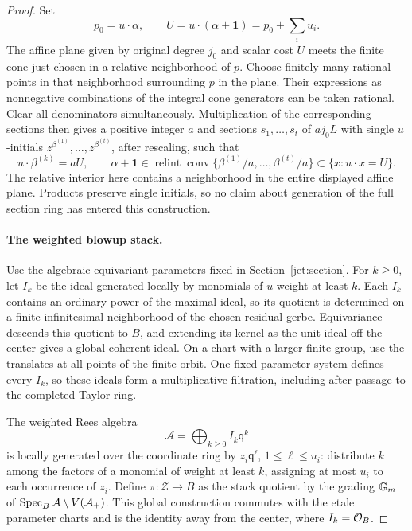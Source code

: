 \begin{proof}
Set
\[
 p_0=u\cdot\alpha,
 \qquad U=u\cdot(\alpha+\mathbf1)=p_0+\sum_i u_i.
\]
The affine plane given by original degree $j_0$ and scalar cost $U$
meets the finite cone just chosen in a relative neighborhood of $p$.
Choose finitely many rational points in that neighborhood surrounding
$p$ in the plane.  Their expressions as nonnegative combinations of
the integral cone generators can be taken rational.  Clear all
denominators simultaneously.  Multiplication of the corresponding
sections then gives a positive integer $a$ and sections
$s_1,\ldots,s_t$ of $aj_0L$ with single $u$-initials
$z^{\beta^{(1)}},\ldots,z^{\beta^{(t)}}$, after rescaling, such that
\begin{equation}\label{adj:surrounding}
 u\cdot\beta^{(k)}=aU,
 \qquad
 \alpha+\mathbf1\in
 \operatorname{relint}\operatorname{conv}
       \{\beta^{(1)}/a,\ldots,\beta^{(t)}/a\}
       \subset\{x:u\cdot x=U\}.
\end{equation}
The relative interior here contains a neighborhood in the entire
displayed affine plane.  Products preserve single initials, so no
claim about generation of the full section ring has entered this
construction.

\paragraph{The weighted blowup stack.}
Use the algebraic equivariant parameters fixed in
Section~\ref{jet:section}.  For $k\geq0$, let $I_k$ be the ideal
generated locally by monomials of $u$-weight at least $k$.
Each $I_k$ contains an ordinary power of the maximal ideal, so its
quotient is determined on a finite infinitesimal neighborhood of the
chosen residual gerbe.  Equivariance descends this quotient to $B$,
and extending its kernel as the unit ideal off the center gives a
global coherent ideal.  On a chart with a larger finite group, use
the translates at all points of the finite orbit.  One fixed parameter
system defines every $I_k$, so these ideals form a multiplicative
filtration, including after passage to the completed Taylor ring.

The weighted Rees algebra
\[
 \mathcal A=\bigoplus_{k\geq0}I_k\mathsf q^k
\]
is locally generated over the coordinate ring by
$z_i\mathsf q^\ell$, $1\leq\ell\leq u_i$: distribute $k$ among
the factors of a monomial of weight at least $k$, assigning at most
$u_i$ to each occurrence of $z_i$.  Define
$\pi:\mathcal Z\to B$ as the stack quotient by the grading
$\mathbb G_m$ of $\operatorname{Spec}_B\mathcal A\setminus V(\mathcal A_+)$.
This global construction commutes with the etale parameter charts
and is the identity away from the center, where $I_k=\mathcal O_B$.


\end{proof}
